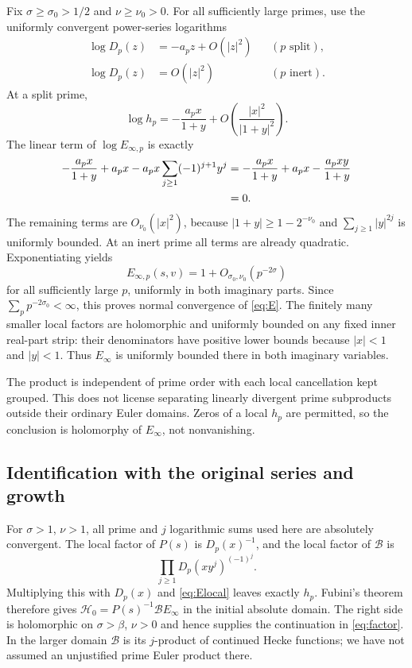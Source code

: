 \documentclass[11pt]{article}
\numberwithin{equation}{section}
\newcommand{\B}{\mathcal B}
\newcommand{\HH}{\mathcal H}
\begin{document}
Fix $\sigma\ge\sigma_0>1/2$ and $\nu\ge\nu_0>0$.
For all sufficiently large primes, use the uniformly convergent
power-series logarithms
\begin{align}
 \log D_p(z)&=-a_pz+O(|z|^2) &&(p\text{ split}),\label{eq:Dexp}\\
 \log D_p(z)&=O(|z|^2) &&(p\text{ inert}).
\end{align}
At a split prime,
\begin{equation}
 \log h_p=-\frac{a_px}{1+y}
          +O\left(\frac{|x|^2}{|1+y|^2}\right).
\end{equation}
The linear term of $\log E_{\infty,p}$ is exactly
\begin{align}
 -\frac{a_px}{1+y}+a_px
 -a_px\sum_{j\ge1}(-1)^{j+1}y^j
 &=-\frac{a_px}{1+y}+a_px-\frac{a_pxy}{1+y}\notag\\
 &=0.\label{eq:cancel}
\end{align}
The remaining terms are $O_{\nu_0}(|x|^2)$, because
$|1+y|\ge1-2^{-\nu_0}$ and
$\sum_{j\ge1}|y|^{2j}$ is uniformly bounded. At an inert prime
all terms are already quadratic. Exponentiating yields
\begin{equation}\label{eq:Eestimate}
 E_{\infty,p}(s,v)=1+O_{\sigma_0,\nu_0}(p^{-2\sigma})
\end{equation}
for all sufficiently large $p$, uniformly in both imaginary parts.
Since $\sum_p p^{-2\sigma_0}<\infty$, this proves normal convergence
of \eqref{eq:E}. The finitely many smaller local factors are
holomorphic and uniformly bounded on any fixed inner real-part
strip: their denominators have positive lower bounds because
$|x|<1$ and $|y|<1$. Thus $E_\infty$ is uniformly bounded there
in both imaginary variables.

The product is independent of prime order with each local
cancellation kept grouped. This does not license separating
linearly divergent prime subproducts outside their ordinary
Euler domains. Zeros of a local $h_p$ are permitted, so the
conclusion is holomorphy of $E_\infty$, not nonvanishing.

\subsection{Identification with the original series and growth}

For $\sigma>1$, $\nu>1$, all prime and $j$ logarithmic sums used
here are absolutely convergent. The local factor of $P(s)$ is
$D_p(x)^{-1}$, and the local factor of $\B$ is
\begin{equation}
 \prod_{j\ge1}D_p(xy^j)^{(-1)^j}.
\end{equation}
Multiplying this with $D_p(x)$ and \eqref{eq:Elocal} leaves exactly
$h_p$. Fubini's theorem therefore gives
$\HH_0=P(s)^{-1}\B E_\infty$ in the initial absolute domain.
The right side is holomorphic on $\sigma>\beta$, $\nu>0$ and
hence supplies the continuation in \eqref{eq:factor}. In the larger
domain $\B$ is its $j$-product of continued Hecke functions;
we have not assumed an unjustified prime Euler product there.
\end{document}
